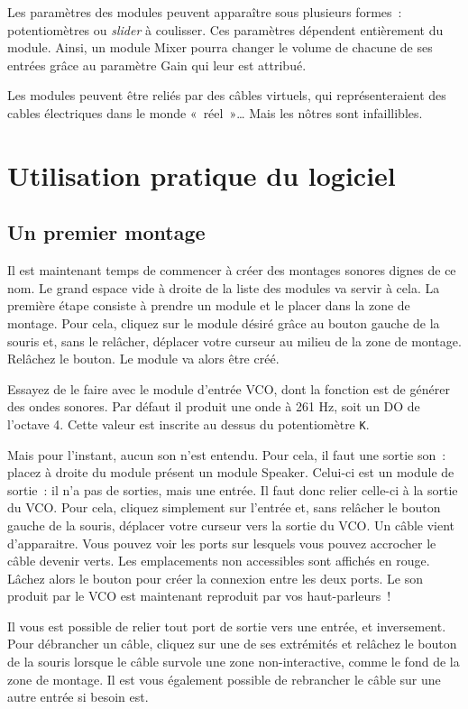 \documentclass[a4paper,oneside,frenchb,10pt]{article}
\begin{document}
Les paramètres des modules peuvent apparaître sous plusieurs formes~:
potentiomètres ou \emph{slider} à coulisser. Ces paramètres dépendent
entièrement du module. Ainsi, un module Mixer pourra changer le volume
de chacune de ses entrées grâce au paramètre Gain qui leur est attribué.

Les modules peuvent être reliés par des câbles virtuels, qui
représenteraient des cables électriques dans le monde «~réel~»\ldots{}
Mais les nôtres sont infaillibles.

\section{Utilisation pratique du logiciel}

\subsection{Un premier montage}

Il est maintenant temps de commencer à créer des montages sonores dignes
de ce nom. Le grand espace vide à droite de la liste des modules va
servir à cela. La première étape consiste à prendre un module et le
placer dans la zone de montage. Pour cela, cliquez sur le module désiré
grâce au bouton gauche de la souris et, sans le relâcher, déplacer votre
curseur au milieu de la zone de montage. Relâchez le bouton. Le module
va alors être créé.

Essayez de le faire avec le module d'entrée VCO, dont la fonction est de
générer des ondes sonores. Par défaut il produit une onde à 261 Hz, soit
un DO de l'octave 4. Cette valeur est inscrite au dessus du
potentiomètre \verb!K!.

Mais pour l'instant, aucun son n'est entendu. Pour cela, il faut une
sortie son~: placez à droite du module présent un module Speaker.
Celui-ci est un module de sortie~: il n'a pas de sorties, mais une
entrée. Il faut donc relier celle-ci à la sortie du VCO. Pour cela,
cliquez simplement sur l'entrée et, sans relâcher le bouton gauche de la
souris, déplacer votre curseur vers la sortie du VCO. Un câble vient
d'apparaitre. Vous pouvez voir les ports sur lesquels vous pouvez
accrocher le câble devenir verts. Les emplacements non accessibles sont
affichés en rouge. Lâchez alors le bouton pour créer la connexion entre
les deux ports. Le son produit par le VCO est maintenant reproduit par
vos haut-parleurs~!

Il vous est possible de relier tout port de sortie vers une entrée, et
inversement. Pour débrancher un câble, cliquez sur une de ses extrémités
et relâchez le bouton de la souris lorsque le câble survole une zone
non-interactive, comme le fond de la zone de montage. Il est vous
également possible de rebrancher le câble sur une autre entrée si besoin
est.
\end{document}
